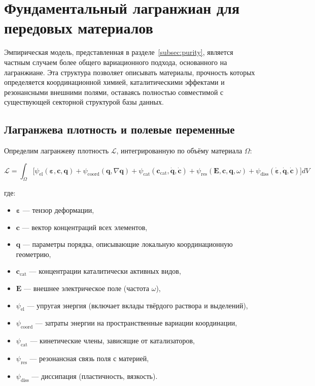 \documentclass[12pt,a4paper]{article}
\begin{document}
	\section{Фундаментальный лагранжиан для передовых материалов}
	\label{sec:lagrangian}
	
	Эмпирическая модель, представленная в разделе~\ref{subsec:purity}, является частным случаем более общего вариационного подхода, основанного на лагранжиане. Эта структура позволяет описывать материалы, прочность которых определяется координационной химией, каталитическими эффектами и резонансными внешними полями, оставаясь полностью совместимой с существующей секторной структурой базы данных.
	
	\subsection{Лагранжева плотность и полевые переменные}
	\label{subsec:lagrangian-density}
	
	Определим лагранжеву плотность \(\mathcal{L}\), интегрированную по объёму материала \(\Omega\):
	
	\[
	\mathcal{L} = \int_{\Omega} \Big[ 
	\psi_{\mathrm{el}}(\boldsymbol{\varepsilon}, \mathbf{c}, \mathbf{q}) 
	+ \psi_{\mathrm{coord}}(\mathbf{q}, \nabla\mathbf{q}) 
	+ \psi_{\mathrm{cat}}(\mathbf{c}_{\mathrm{cat}}, \dot{\mathbf{q}}, \dot{\mathbf{c}}) 
	+ \psi_{\mathrm{res}}(\mathbf{E}, \mathbf{c}, \mathbf{q}, \omega) 
	+ \psi_{\mathrm{diss}}(\dot{\boldsymbol{\varepsilon}}, \dot{\mathbf{q}}, \dot{\mathbf{c}})
	\Big] dV
	\]
	
	где:
	\begin{itemize}
		\item \(\boldsymbol{\varepsilon}\) — тензор деформации,
		\item \(\mathbf{c}\) — вектор концентраций всех элементов,
		\item \(\mathbf{q}\) — параметры порядка, описывающие локальную координационную геометрию,
		\item \(\mathbf{c}_{\mathrm{cat}}\) — концентрации каталитически активных видов,
		\item \(\mathbf{E}\) — внешнее электрическое поле (частота \(\omega\)),
		\item \(\psi_{\mathrm{el}}\) — упругая энергия (включает вклады твёрдого раствора и выделений),
		\item \(\psi_{\mathrm{coord}}\) — затраты энергии на пространственные вариации координации,
		\item \(\psi_{\mathrm{cat}}\) — кинетические члены, зависящие от катализаторов,
		\item \(\psi_{\mathrm{res}}\) — резонансная связь поля с материей,
		\item \(\psi_{\mathrm{diss}}\) — диссипация (пластичность, вязкость).
	\end{itemize}
	
\end{document}
